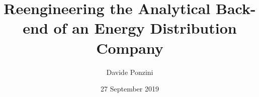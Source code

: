 \title{Reengineering the Analytical Back-end of an Energy Distribution Company}

\author{Davide Ponzini}


\date{27 September 2019}
